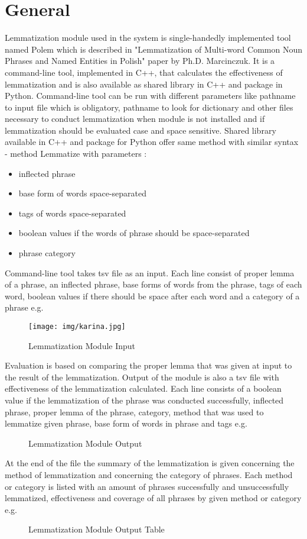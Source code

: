 \documentclass[12pt]{report}
\begin{document}
\section{General}
Lemmatization module used in the system is single-handedly implemented tool named Polem which is described in "Lemmatization of Multi-word Common Noun Phrases and Named Entities in Polish" paper by Ph.D. Marcinczuk. It is a command-line tool, implemented in C++, that calculates the effectiveness of lemmatization and is also available as shared library in C++ and package in Python. Command-line tool can be run with different parameters like pathname to input file which is obligatory, pathname to look for dictionary and other files necessary to conduct lemmatization when module is not installed and if lemmatization should be evaluated case and space sensitive.
Shared library available in C++ and package for Python offer same method with similar syntax - method Lemmatize with parameters :\begin{itemize}
\item inflected phrase
\item base form of words space-separated
\item tags of words space-separated
\item boolean values if the words of phrase should be space-separated
\item phrase category
\end{itemize}
Command-line tool takes tsv file as an input. Each line consist of proper lemma of a phrase, an inflected phrase, base forms of words from the phrase, tags of each word, boolean values if there should be space after each word and a category of a phrase e.g.
        
\begin{figure}[ht]
	\centering
	\texttt{[image: img/karina.jpg]}
	\caption{Lemmatization Module Input}
\end{figure}
        
Evaluation is based on comparing the proper lemma that was given at input to the result of the lemmatization. Output of the module is also a tsv file with effectiveness of the lemmatization calculated. Each line consists of a boolean value if the lemmatization of the phrase was conducted successfully, inflected phrase, proper lemma of the phrase, category, method that was used to lemmatize given phrase, base form of words in phrase and tags e.g.
        
\begin{figure}[ht]
	\caption{Lemmatization Module Output}
\end{figure}
At the end of the file the summary of the lemmatization is given concerning the method of lemmatization and concerning the category of phrases. Each method or category is listed with an amount of phrases successfully and unsuccessfully lemmatized, effectiveness and coverage of all phrases by given method or category e.g.
\begin{figure}[h]
	\centering
	\caption{Lemmatization Module Output Table}
\end{figure}
\end{document}
